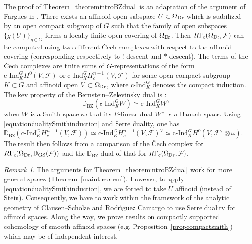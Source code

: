 \documentclass[a4paper,10pt]{amsart}
\theoremstyle{remark}
\newtheorem{remark}[theorem]{Remark}
\theoremstyle{definition}
\theoremstyle{plain}
\numberwithin{equation}{section}
\newcommand{\bbD}{{\mathbb D}}
\newcommand{\calF}{{\mathcal F}}
\newcommand{\GS}{{\rm GS}}
\newcommand{\cInd}{\mathrm{c\text{-}Ind}}
\newcommand{\BZ}{\ensuremath{\mathrm{BZ}}}
\begin{document}
The proof of Theorem~\ref{theoremintroBZdual} is an adaptation of the argument of Fargues in \cite{Farguesdualite}. There exists an affinoid open subspace $U\subset \Omega_{\rm Dr}$ which is stabilized by an open compact subgroup of $G$ such that the family of open subspaces $\{g(U)\}_{g\in G}$ forms a locally finite open covering of $\Omega_{\rm Dr}$. Then $ R\Gamma_c(\Omega_{\rm Dr},\calF)$ can be computed using two different \v{C}ech complexes with respect to the affinoid covering (corresponding respectively to $!$-descent and $*$-descent). The terms of the \v{C}ech complexes are finite sums  of $G$-representations of the form $\cInd_{K}^GH^0(V,\calF)$ or $\cInd_{K}^GH^{n-1}_c(V,\calF)$ for some open compact subgroup $K\subset G$ and affinoid open $V\subset \Omega_{\rm Dr}$, where $\cInd_K^G$ denotes the compact induction. The key property of the Bernstein--Zelevinsky dual is \cite[Thm.~5.3]{strauch2025bernsteinzelevinskydualitylocallyanalytic}:
\begin{equation}\label{equationdualitySmithinduction}
\bbD_{\BZ}(\cInd_K^G W)\simeq \cInd_K^G W^{\vee}
\end{equation}
when $W$ is a Smith space so that its $E$-linear dual $W^{\vee}$ is a Banach space. Using \eqref{equationdualitySmithinduction} and Serre duality, one has $\bbD_{\BZ}(\cInd_{K}^GH^{n-1}_c(V,\calF))\simeq \cInd_{K}^GH^{n-1}_c(V,\calF)^{\vee}\simeq \cInd_{K}^GH^{0}(V,\calF^{\vee}\otimes \omega)$. The result then follows from a comparison of the \v{C}ech complex for $R\Gamma_c(\Omega_{\rm Dr},\bbD_{\GS}(\calF))$ and the $\bbD_{\BZ}$-dual of that for $R\Gamma_c(\Omega_{\rm Dr},\calF)$. 
\begin{remark}
	The arguments for Theorem~\ref{theoremintroBZdual} work for more general spaces (Theorem~\ref{maintheorem}). However, to apply \eqref{equationdualitySmithinduction}, we are forced to take $U$ affinoid (instead of Stein). Consequently, we have to work within the framework of the analytic geometry of Clausen--Scholze \cite{scholze2019condensed,scholze2022complex} and Rodr{\'\i}guez Camargo \cite{camargo2024analytic,Juan2024solidgeometry} to use Serre duality for affinoid spaces. Along the way, we prove results on compactly supported cohomology of smooth affinoid spaces (e.g. Proposition~\ref{propcompactsmith}) which may be of independent interest.
\end{remark}
\end{document}
